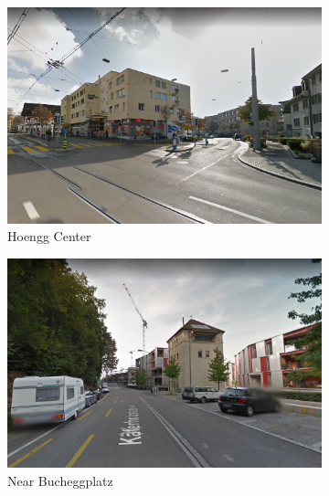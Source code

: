 \documentclass[letterpaper]{article}
\begin{document}
\begin{figure}[H]
    \centering
    \begin{subfigure}[t]{.45\columnwidth}
        \centering
        \includegraphics[width=\linewidth]{images/good/hoengg.png}
        \caption[width=.9\linewidth]{Hoengg Center}
    \end{subfigure}\hspace{0.05\columnwidth}
    \begin{subfigure}[t]{.45\columnwidth}
        \centering
        \includegraphics[width=\linewidth]{images/good/buchegg.png}
        \caption[width=.9\linewidth]{Near Bucheggplatz}
    \end{subfigure}\vspace{1mm}
    \begin{subfigure}[t]{.45\columnwidth}
        \centering

\end{subfigure}
\end{figure}
\end{document}
